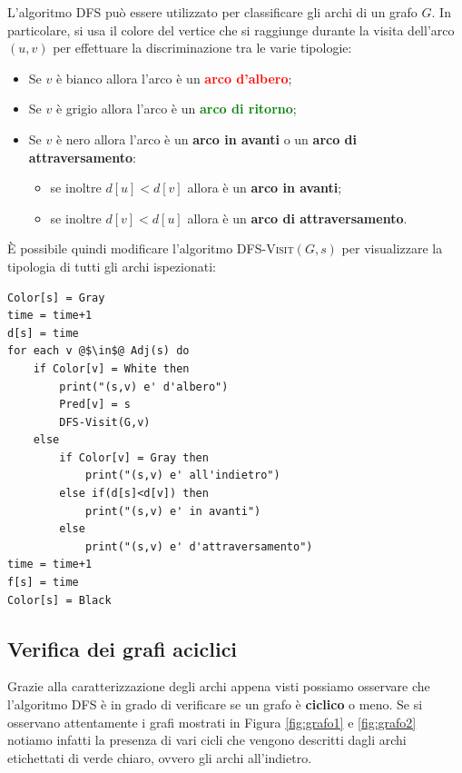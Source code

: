 L'algoritmo \textsc{DFS} può essere utilizzato per classificare gli archi di un grafo $G$. In particolare, si usa il colore del vertice che si raggiunge durante la visita dell'arco $(u,v)$ per effettuare la discriminazione tra le varie tipologie:
\begin{itemize}
	\item Se $v$ è bianco allora l'arco è un \textbf{\textcolor{red}{arco d'albero}};
	\item Se $v$ è grigio allora l'arco è un \textbf{\textcolor{green}{arco di ritorno}};
	\item Se $v$ è nero allora l'arco è un \textbf{\textcolor{purple!75!black}{arco in avanti}} o un \textbf{\textcolor{green!35!black}{arco di attraversamento}}:
	\begin{itemize}
		\item se inoltre $d[u]<d[v]$ allora è un \textbf{\textcolor{purple!75!black}{arco in avanti}};
		\item se inoltre $d[v]<d[u]$ allora è un \textbf{\textcolor{green!35!black}{arco di attraversamento}}.
	\end{itemize}
\end{itemize}
È possibile quindi modificare l'algoritmo \textsc{DFS-Visit}$(G,s)$ per visualizzare la tipologia di tutti gli archi ispezionati:
\begin{lstlisting}[language=asd,caption={Print-DFS-Visit(G,s)}]
Color[s] = Gray
time = time+1
d[s] = time
for each v @$\in$@ Adj(s) do
	if Color[v] = White then
		print("(s,v) e' d'albero")
		Pred[v] = s
		DFS-Visit(G,v)
	else
		if Color[v] = Gray then
			print("(s,v) e' all'indietro")
		else if(d[s]<d[v]) then
			print("(s,v) e' in avanti")
		else
			print("(s,v) e' d'attraversamento")
time = time+1
f[s] = time
Color[s] = Black
\end{lstlisting}

\subsection{Verifica dei grafi aciclici}
Grazie alla caratterizzazione degli archi appena visti possiamo osservare che l'algoritmo \textsc{DFS} è in grado di verificare se un grafo è \textbf{ciclico} o meno. Se si osservano attentamente i grafi mostrati in Figura \ref{fig:grafo1} e \ref{fig:grafo2} notiamo infatti la presenza di vari cicli che vengono descritti dagli archi etichettati di verde chiaro, ovvero gli archi all'indietro.

